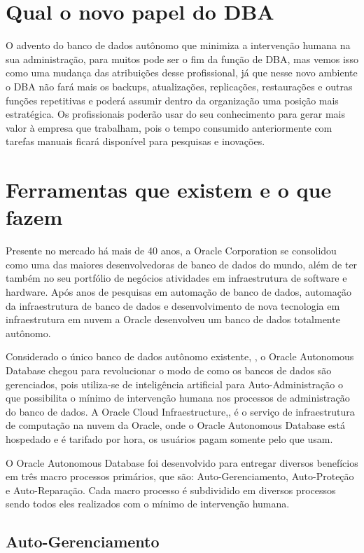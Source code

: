 \section{Qual o novo papel do DBA}

O advento do banco de dados autônomo que minimiza a intervenção humana na sua administração, para muitos pode ser o fim da função de DBA, mas vemos isso como uma mudança das atribuições desse profissional, já que nesse novo ambiente o DBA não fará mais os backups, atualizações, replicações, restaurações e outras funções repetitivas e poderá assumir dentro da organização uma posição mais estratégica. Os profissionais poderão usar do seu conhecimento para gerar mais valor à empresa que trabalham, pois o tempo consumido anteriormente com tarefas manuais ficará disponível para pesquisas e inovações.


\section{Ferramentas que existem e o que fazem}

Presente no mercado há mais de 40 anos, a Oracle Corporation se consolidou como uma das maiores desenvolvedoras de banco de dados do mundo, além de ter também no seu portfólio de negócios atividades em infraestrutura de software e hardware.  Após anos de pesquisas em automação de banco de dados, automação da infraestrutura de banco de dados e desenvolvimento de nova tecnologia em infraestrutura em nuvem a Oracle desenvolveu um banco de dados totalmente autônomo.

Considerado o único banco de dados autônomo existente, \cite{Auricchio}, o Oracle Autonomous Database chegou para revolucionar o modo de como os bancos de dados são gerenciados, pois utiliza-se de inteligência artificial para Auto-Administração o que possibilita o mínimo de intervenção humana nos processos de administração do banco de dados. A Oracle Cloud Infraestructure,\cite{OCI}, é o serviço de infraestrutura de computação na nuvem da Oracle, onde o Oracle Autonomous Database está hospedado e é tarifado por hora, os usuários pagam somente pelo que usam.

O Oracle Autonomous Database foi desenvolvido para entregar diversos benefícios em três macro processos primários, que são: Auto-Gerenciamento, Auto-Proteção e Auto-Reparação. Cada macro processo é subdividido em diversos processos sendo todos eles realizados com o mínimo de intervenção humana.


\subsection{Auto-Gerenciamento}


